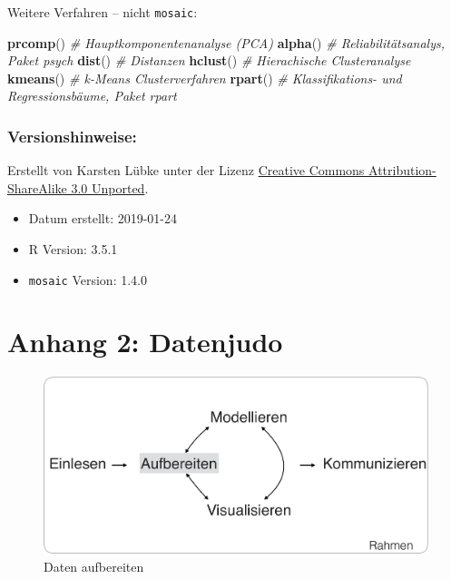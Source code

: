 \documentclass[12pt,ngerman,paper=a4,pagesize,DIV=13]{scrreprt}
\newenvironment{Shaded}{\begin{snugshade}}{\end{snugshade}}
\newcommand{\CommentTok}[1]{\textcolor[rgb]{0.56,0.35,0.01}{\textit{#1}}}
\newcommand{\KeywordTok}[1]{\textcolor[rgb]{0.13,0.29,0.53}{\textbf{#1}}}
\newcommand{\NormalTok}[1]{#1}
\providecommand{\tightlist}{%
  \setlength{\itemsep}{0pt}\setlength{\parskip}{0pt}}
\begin{document}
Weitere Verfahren -- nicht \texttt{mosaic}:

\begin{Shaded}
\begin{Highlighting}[]
\KeywordTok{prcomp}\NormalTok{() }\CommentTok{# Hauptkomponentenanalyse (PCA)}
\KeywordTok{alpha}\NormalTok{() }\CommentTok{# Reliabilitätsanalys, Paket psych}
\KeywordTok{dist}\NormalTok{() }\CommentTok{# Distanzen}
\KeywordTok{hclust}\NormalTok{() }\CommentTok{# Hierachische Clusteranalyse}
\KeywordTok{kmeans}\NormalTok{() }\CommentTok{# k-Means Clusterverfahren}
\KeywordTok{rpart}\NormalTok{() }\CommentTok{# Klassifikations- und Regressionsbäume, Paket rpart}
\end{Highlighting}
\end{Shaded}

\hypertarget{versionshinweise-6}{%
\subsection{Versionshinweise:}\label{versionshinweise-6}}

Erstellt von Karsten Lübke unter der Lizenz
\href{http://creativecommons.org/licenses/by-sa/3.0}{Creative Commons
Attribution-ShareAlike 3.0 Unported}.

\begin{itemize}
\tightlist
\item
  Datum erstellt: 2019-01-24
\item
  R Version: 3.5.1
\item
  \texttt{mosaic} Version: 1.4.0
\end{itemize}

\hypertarget{anhang-2-datenjudo}{%
\chapter{Anhang 2: Datenjudo}\label{anhang-2-datenjudo}}

\begin{figure}

{\centering \includegraphics{Inhalte/images/Datenjudo/Aufbereiten} 

}

\caption{Daten aufbereiten}\label{fig:unnamed-chunk-207}
\end{figure}
\end{document}
